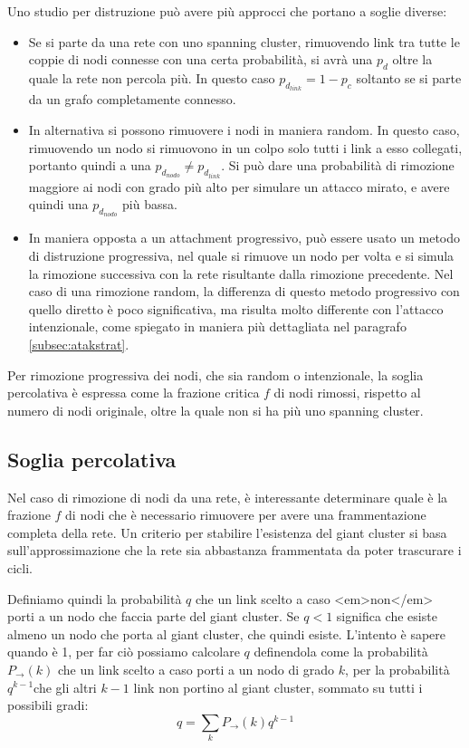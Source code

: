 Uno studio per distruzione può avere più approcci che portano a soglie diverse:
\begin{itemize}
 \item Se si parte da una rete con uno spanning cluster, rimuovendo link tra tutte le coppie di nodi connesse con una certa probabilità, si avrà una $p_d$ oltre la quale la rete non percola più. In questo caso $p_{d_{link}} = 1-p_c$ soltanto se si parte da un grafo completamente connesso.
 \item In alternativa si possono rimuovere i nodi in maniera random. In questo caso, rimuovendo un nodo si rimuovono in un colpo solo tutti i link a esso collegati, portanto quindi a una $p_{d_{nodo}} \neq p_{d_{link}}$. Si può dare una probabilità di rimozione maggiore ai nodi con grado più alto per simulare un attacco mirato, e avere quindi una $p_{d_{nodo}}$ più bassa.
 \item In maniera opposta a un attachment progressivo, può essere usato un metodo di distruzione progressiva, nel quale si rimuove un nodo per volta e si simula la rimozione successiva con la rete risultante dalla rimozione precedente. Nel caso di una rimozione random, la differenza di questo metodo progressivo con quello diretto è poco significativa, ma risulta molto differente con l'attacco intenzionale, come spiegato in maniera più dettagliata nel paragrafo \ref{subsec:atakstrat}.
\end{itemize}

Per rimozione progressiva dei nodi, che sia random o intenzionale, la soglia percolativa è espressa come la frazione critica $f$ di nodi rimossi, rispetto al numero di nodi originale, oltre la quale non si ha più uno spanning cluster.

\subsection{Soglia percolativa} 
Nel caso di rimozione di nodi da una rete, è interessante determinare quale è la frazione $f$ di nodi che è necessario rimuovere per avere una frammentazione completa della rete. Un criterio per stabilire l'esistenza del giant cluster si basa sull'approssimazione che la rete sia abbastanza frammentata da poter trascurare i cicli.

Definiamo quindi la probabilità $q$ che un link scelto a caso <em>non</em> porti a un nodo che faccia parte del giant cluster. Se $q < 1$ significa che esiste almeno un nodo che porta al giant cluster, che quindi esiste. L'intento è sapere quando è 1, per far ciò possiamo calcolare $q$ definendola come la probabilità $P_{\rightarrow}(k)$ che un link scelto a caso porti a un nodo di grado $k$, per la probabilità $q^{k-1}$che gli altri $k-1$ link non portino al giant cluster, sommato su tutti i possibili gradi:
\begin{equation}
q = \sum_k P_{\rightarrow}(k) q^{k-1}
\label{eq:condizione}
\end{equation}

